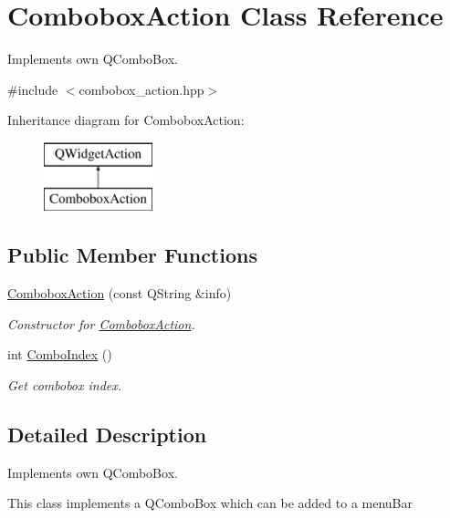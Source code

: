 \hypertarget{classComboboxAction}{}\section{Combobox\+Action Class Reference}
\label{classComboboxAction}


Implements own Q\+Combo\+Box.  




{\ttfamily \#include $<$combobox\+\_\+action.\+hpp$>$}

Inheritance diagram for Combobox\+Action\+:\begin{figure}[H]
\begin{center}
\leavevmode
\includegraphics[height=2.000000cm]{classComboboxAction}
\end{center}
\end{figure}
\subsection*{Public Member Functions}
\begin{DoxyCompactItemize}
\item 
\mbox{\hyperlink{classComboboxAction_afa2a6bfade094a82beef7d478c5a4cf8}{Combobox\+Action}} (const Q\+String \&info)
\begin{DoxyCompactList}\small\item\em Constructor for \mbox{\hyperlink{classComboboxAction}{Combobox\+Action}}. \end{DoxyCompactList}\item 
int \mbox{\hyperlink{classComboboxAction_adfe475154e5b88eddbc9a51759bdf312}{Combo\+Index}} ()
\begin{DoxyCompactList}\small\item\em Get combobox index. \end{DoxyCompactList}\end{DoxyCompactItemize}


\subsection{Detailed Description}
Implements own Q\+Combo\+Box. 

This class implements a Q\+Combo\+Box which can be added to a menu\+Bar 

